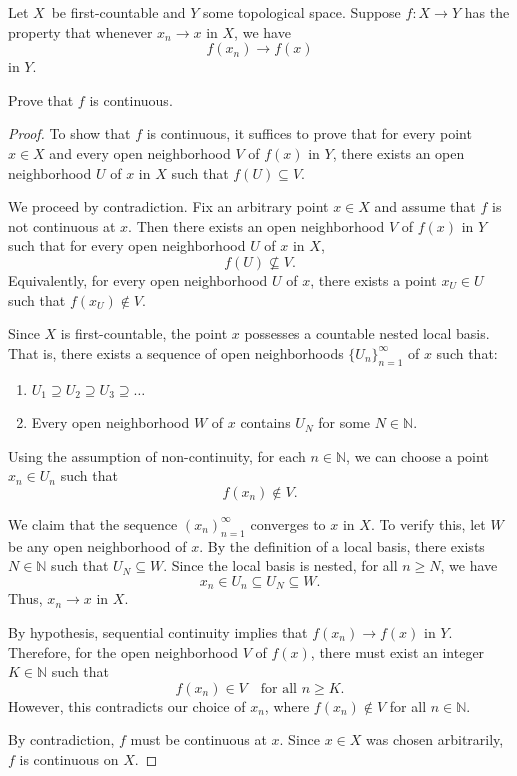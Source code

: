 \documentclass[11pt]{article}
\begin{document}
\begin{prob}
    Let $X$ be first-countable and $Y$ some topological space. 
    Suppose $f : X \to Y$ has the property that whenever 
    $x_n \to x$ in $X$, we have 
    \[
        f(x_n) \to f(x)
    \]
    in $Y$. 

    Prove that $f$ is continuous. 
\end{prob}
\begin{proof}
To show that $f$ is continuous, it suffices to prove that for every point $x \in X$ and every open neighborhood $V$ of $f(x)$ in $Y$, there exists an open neighborhood $U$ of $x$ in $X$ such that $f(U) \subseteq V$.

We proceed by contradiction. Fix an arbitrary point $x \in X$ and assume that $f$ is not continuous at $x$. Then there exists an open neighborhood $V$ of $f(x)$ in $Y$ such that for every open neighborhood $U$ of $x$ in $X$, 
\[
f(U) \nsubseteq V.
\]
Equivalently, for every open neighborhood $U$ of $x$, there exists a point $x_U \in U$ such that $f(x_U) \notin V$.

Since $X$ is first-countable, the point $x$ possesses a countable nested local basis. That is, there exists a sequence of open neighborhoods $\{U_n\}_{n=1}^\infty$ of $x$ such that:
\begin{enumerate}
    \item $U_1 \supseteq U_2 \supseteq U_3 \supseteq \dots$
    \item Every open neighborhood $W$ of $x$ contains $U_N$ for some $N \in \mathbb{N}$.
\end{enumerate}

Using the assumption of non-continuity, for each $n \in \mathbb{N}$, we can choose a point $x_n \in U_n$ such that 
\[
f(x_n) \notin V.
\]

We claim that the sequence $(x_n)_{n=1}^\infty$ converges to $x$ in $X$. To verify this, let $W$ be any open neighborhood of $x$. By the definition of a local basis, there exists $N \in \mathbb{N}$ such that $U_N \subseteq W$. Since the local basis is nested, for all $n \ge N$, we have
\[
x_n \in U_n \subseteq U_N \subseteq W.
\]
Thus, $x_n \to x$ in $X$.

By hypothesis, sequential continuity implies that $f(x_n) \to f(x)$ in $Y$. Therefore, for the open neighborhood $V$ of $f(x)$, there must exist an integer $K \in \mathbb{N}$ such that 
\[
f(x_n) \in V \quad \text{for all } n \ge K.
\]
However, this contradicts our choice of $x_n$, where $f(x_n) \notin V$ for all $n \in \mathbb{N}$.

By contradiction, $f$ must be continuous at $x$. Since $x \in X$ was chosen arbitrarily, $f$ is continuous on $X$.
\end{proof}
\end{document}
